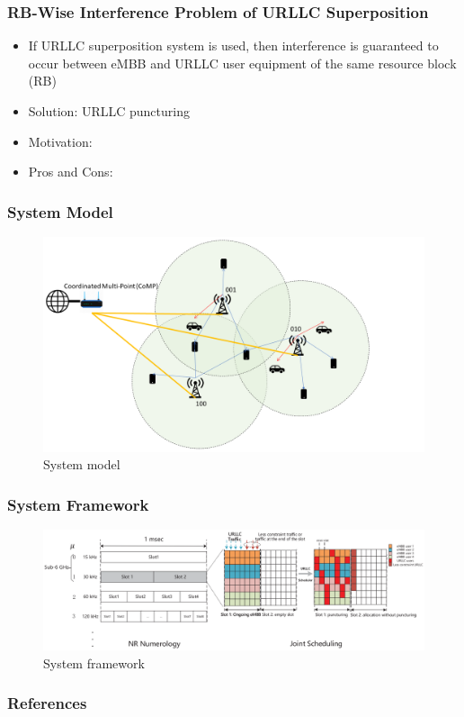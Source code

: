 \documentclass{beamer}
\begin{document}
\begin{frame}
  \frametitle{RB-Wise Interference Problem of URLLC Superposition}
  \begin{itemize}
    \item If URLLC superposition system is used, then interference is guaranteed to occur between eMBB and URLLC user equipment of the same resource block (RB)
    \item Solution: URLLC puncturing
    \item Motivation: \cite{urllcSuperpositionRefuse}
    \item Pros and Cons:
  \end{itemize}
\end{frame}

\begin{frame}
  \frametitle{System Model}
  \begin{figure}
    \includegraphics[width=\textwidth]{system_model}
    \caption{System model}
  \end{figure}
\end{frame}

\begin{frame}
  \frametitle{System Framework}
  \begin{figure}
    \includegraphics[width=\textwidth]{system_framework}
    \caption{System framework \cite{embbUrllcMultiplexing}}
  \end{figure}
\end{frame}

\begin{frame}
  \frametitle{References}
  \printbibliography[heading=none]
\end{frame}
\end{document}
